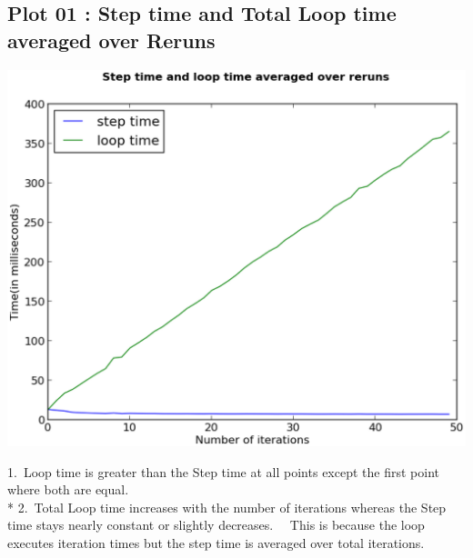 \documentclass[11pt]{article}
\begin{document}
\subsection{Plot 01 : Step time and Total Loop time averaged over Reruns}
\begin{center}
\includegraphics[scale=0.5]{plot01}
\end{center}
1.\ Loop time is greater than the Step time at all points except the first point where both are equal.
\\* 2.\ Total Loop time increases with the number of iterations whereas the Step time stays nearly constant or slightly decreases. \ \ This is because the loop executes iteration times but the step time is averaged over total iterations.
\end{document}
